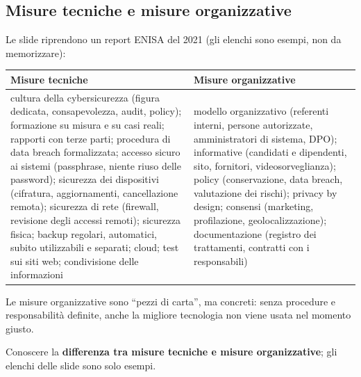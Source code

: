 \subsection{Misure tecniche e misure organizzative}
Le slide riprendono un report ENISA del 2021 (gli elenchi sono esempi, non da memorizzare):
\begin{center}
\small
\begin{tabularx}{\linewidth}{X X}
\toprule
\textbf{Misure tecniche} & \textbf{Misure organizzative}\\
\midrule
cultura della cybersicurezza (figura dedicata, consapevolezza, audit, policy); formazione su misura e su
casi reali; rapporti con terze parti; procedura di data breach formalizzata; accesso sicuro ai sistemi
(passphrase, niente riuso delle password); sicurezza dei dispositivi (cifratura, aggiornamenti,
cancellazione remota); sicurezza di rete (firewall, revisione degli accessi remoti); sicurezza fisica;
backup regolari, automatici, subito utilizzabili e separati; cloud; test sui siti web; condivisione delle
informazioni &
modello organizzativo (referenti interni, persone autorizzate, amministratori di sistema, DPO);
informative (candidati e dipendenti, sito, fornitori, videosorveglianza); policy (conservazione, data
breach, valutazione dei rischi); privacy by design; consensi (marketing, profilazione, geolocalizzazione);
documentazione (registro dei trattamenti, contratti con i responsabili)\\
\bottomrule
\end{tabularx}
\end{center}
Le misure organizzative sono ``pezzi di carta'', ma concreti: senza procedure e responsabilità
definite, anche la migliore tecnologia non viene usata nel momento giusto.

\begin{esame}
Conoscere la \textbf{differenza tra misure tecniche e misure organizzative}; gli elenchi delle slide
sono solo esempi.
\end{esame}

